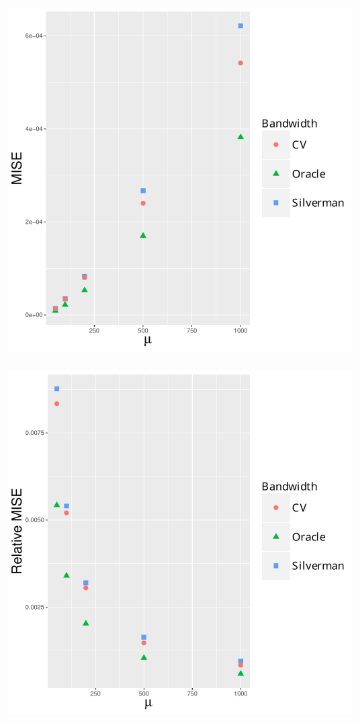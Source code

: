 \begin{figure}[htbp]
    \centering
    \begin{subfigure}[b]{0.24\textwidth}
        \includegraphics[width=\textwidth]{results/by_num_cases/MISE-vs-cases}
        \label{fig:ise:unif_NCases_1h:mise}
    \end{subfigure}
    \begin{subfigure}[b]{0.24\textwidth}
        \includegraphics[width=\textwidth]{results/by_num_cases/RMISE-vs-cases}

\end{subfigure}
\end{figure}
